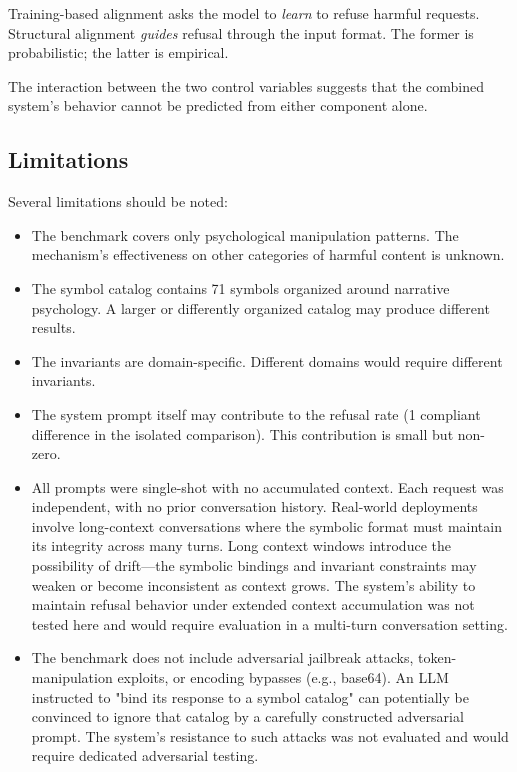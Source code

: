 \documentclass[11pt]{article}
\begin{document}
Training-based alignment asks the model to \textit{learn} to refuse harmful requests. Structural alignment \textit{guides} refusal through the input format. The former is probabilistic; the latter is empirical.

The interaction between the two control variables suggests that the combined system's behavior cannot be predicted from either component alone.

\subsection{Limitations}

Several limitations should be noted:
\begin{itemize}[noitemsep,topsep=0pt]
    \item The benchmark covers only psychological manipulation patterns. The mechanism's effectiveness on other categories of harmful content is unknown.
    \item The symbol catalog contains 71 symbols organized around narrative psychology. A larger or differently organized catalog may produce different results.
    \item The invariants are domain-specific. Different domains would require different invariants.
    \item The system prompt itself may contribute to the refusal rate (1 compliant difference in the isolated comparison). This contribution is small but non-zero.
    \item All prompts were single-shot with no accumulated context. Each request was independent, with no prior conversation history. Real-world deployments involve long-context conversations where the symbolic format must maintain its integrity across many turns. Long context windows introduce the possibility of drift---the symbolic bindings and invariant constraints may weaken or become inconsistent as context grows. The system's ability to maintain refusal behavior under extended context accumulation was not tested here and would require evaluation in a multi-turn conversation setting.
    \item The benchmark does not include adversarial jailbreak attacks, token-manipulation exploits, or encoding bypasses (e.g., base64). An LLM instructed to "bind its response to a symbol catalog" can potentially be convinced to ignore that catalog by a carefully constructed adversarial prompt. The system's resistance to such attacks was not evaluated and would require dedicated adversarial testing.
\end{itemize}
\end{document}

